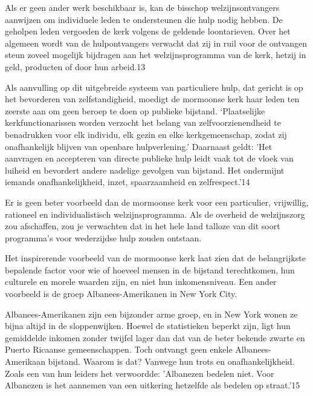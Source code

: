 \documentclass[
  a5paper,
  smalldemyvopaper,10pt,twoside,onecolumn,openright,extrafontsizes,hidelinks]{memoir}
\begin{document}
Als er geen ander werk beschikbaar is, kan de bisschop
welzijnsontvangers aanwijzen om individuele leden te ondersteunen die
hulp nodig hebben. De geholpen leden vergoeden de kerk volgens de
geldende loontarieven. Over het algemeen wordt van de hulpontvangers
verwacht dat zij in ruil voor de ontvangen steun zoveel mogelijk
bijdragen aan het welzijnsprogramma van de kerk, hetzij in geld,
producten of door hun arbeid.13

Als aanvulling op dit uitgebreide systeem van particuliere hulp, dat
gericht is op het bevorderen van zelfstandigheid, moedigt de mormoonse
kerk haar leden ten zeerste aan om geen beroep te doen op publieke
bijstand. `Plaatselijke kerkfunctionarissen worden verzocht het belang
van zelfvoorzienendheid te benadrukken voor elk individu, elk gezin en
elke kerkgemeenschap, zodat zij onafhankelijk blijven van openbare
hulpverlening.' Daarnaast geldt: 'Het aanvragen en accepteren van
directe publieke hulp leidt vaak tot de vloek van luiheid en bevordert
andere nadelige gevolgen van bijstand. Het ondermijnt iemands
onafhankelijkheid, inzet, spaarzaamheid en zelfrespect.'14

Er is geen beter voorbeeld dan de mormoonse kerk voor een particulier,
vrijwillig, rationeel en individualistisch welzijnsprogramma. Als de
overheid de welzijnszorg zou afschaffen, zou je verwachten dat in het
hele land talloze van dit soort programma's voor wederzijdse hulp zouden
ontstaan.

Het inspirerende voorbeeld van de mormoonse kerk laat zien dat de
belangrijkste bepalende factor voor wie of hoeveel mensen in de bijstand
terechtkomen, hun culturele en morele waarden zijn, en niet hun
inkomensniveau. Een ander voorbeeld is de groep Albanees-Amerikanen in
New York City.

Albanees-Amerikanen zijn een bijzonder arme groep, en in New York wonen
ze bijna altijd in de sloppenwijken. Hoewel de statistieken beperkt
zijn, ligt hun gemiddelde inkomen zonder twijfel lager dan dat van de
beter bekende zwarte en Puerto Ricaanse gemeenschappen. Toch ontvangt
geen enkele Albanees-Amerikaan bijstand. Waarom is dat? Vanwege hun
trots en onafhankelijkheid. Zoals een van hun leiders het verwoordde:
'Albanezen bedelen niet. Voor Albanezen is het aannemen van een
uitkering hetzelfde als bedelen op straat.'15
\end{document}
